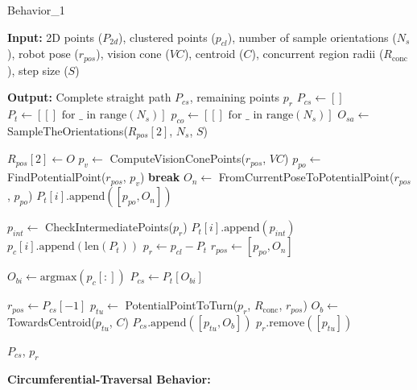 \begin{algorithm}[H]
    \caption{Behavior\_1}
    \label{alg:behavioral1}
    \begin{algorithmic}[1]

    \Statex \textbf{Input:} 2D points ($P_{2d}$), clustered points ($p_{cl}$), number of sample orientations ($N_s$), robot pose ($r_{pos}$), vision cone ($VC$), centroid ($C$), concurrent region radii ($R_{\text{conc}}$), step size ($S$)

    \Statex \textbf{Output:} Complete straight path $P_{cs}$, remaining points $p_r$
    \newline
    \State $P_{cs} \leftarrow []$
    \State $P_t \leftarrow [[] \text{ for } \_ \text{ in range}(N_s)]$
    \State $p_{co} \leftarrow [[] \text{ for } \_ \text{ in range}(N_s)]$
    \State $O_{sa} \leftarrow$ SampleTheOrientations($R_{pos}[2]$, $N_s$, $S$)
    
        \State $R_{pos}[2] \leftarrow O$
            \State $p_v \leftarrow$ ComputeVisionConePoints($r_{pos}$, $VC$)
            \State $p_{po} \leftarrow$ FindPotentialPoint($r_{pos}$, $p_v$)
                \State \textbf{break}
            \EndIf
            \State $O_n \leftarrow$ FromCurrentPoseToPotentialPoint($r_{pos}$, $p_{po}$)
            \State $P_t[i].\text{append}([p_{po}, O_n])$
            
            \State $p_{int} \leftarrow$ CheckIntermediatePoints($p_r$)
            \State $P_t[i].\text{append}(p_{int})$
            \State $p_c[i].\text{append}(\text{len}(P_t))$
            \State $p_r \leftarrow p_{cl} - P_t$
            \State $r_{pos} \leftarrow [p_{po}, O_n]$
        \EndWhile
    \EndFor
    
    \State $O_{bi} \leftarrow \text{argmax}(p_c[:])$
    \State $P_{cs} \leftarrow P_t[O_{bi}]$
    
    \State $r_{pos} \leftarrow P_{cs}[-1]$
    \State $p_{tu} \leftarrow$ PotentialPointToTurn($p_r$, $R_{\text{conc}}$, $r_{pos}$)
    \State $O_b \leftarrow$ TowardsCentroid($p_{tu}$, $C$)
    \State $P_{cs}.\text{append}([p_{tu}, O_b])$
    \State $p_r.\text{remove}([p_{tu}])$
    
    \State \Return $P_{cs}$, $p_r$
    \end{algorithmic}
    \end{algorithm}
    


\textbf{Circumferential-Traversal Behavior:} 

